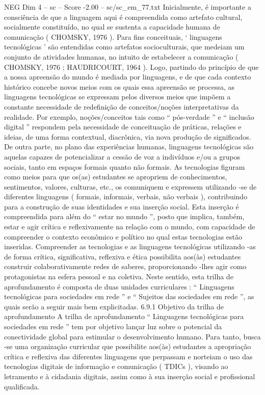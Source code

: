 \begin{textsample}{NEG Dim 4 – sc – Score -2.00 – sc/sc\_em\_77.txt}
Inicialmente, é importante a consciência de que a linguagem aqui é compreendida como artefato cultural, socialmente constituído, no qual se sustenta a capacidade humana de comunicação ( CHOMSKY, 1976 ).
Para fins conceituais, ‘ linguagens tecnológicas ’ são entendidas como artefatos socioculturais, que medeiam um conjunto de atividades humanas, no intuito de estabelecer a comunicação ( CHOMSKY, 1976 ; HAUDRICOURT, 1964 ).
Logo, partindo do princípio de que a nossa apreensão do mundo é mediada por linguagens, e de que cada contexto histórico concebe novos meios com os quais essa apreensão se processa, as linguagens tecnológicas se expressam pelos diversos meios que impõem a constante necessidade de redefinição de conceitos/noções interpretativas da realidade.
Por exemplo, noções/conceitos tais como “ pós-verdade ” e “ inclusão digital ” respondem pela necessidade de conceituação de práticas, relações e ideias, de uma forma contextual, diacrônica, via nova produção de significados.
De outra parte, no plano das experiências humanas, linguagens tecnológicas são aquelas capazes de potencializar a cessão de voz a indivíduos e/ou a grupos sociais, tanto em espaços formais quanto não formais.
As tecnologias figuram como meios para que os(as) estudantes se apropriem de conhecimentos, sentimentos, valores, culturas, etc., os comuniquem e expressem utilizando -se de diferentes linguagens ( formais, informais, verbais, não verbais ), contribuindo para a construção de suas identidades e sua inserção social.
Esta inserção é compreendida para além do “ estar no mundo ”, posto que implica, também, estar e agir crítica e reflexivamente na relação com o mundo, com capacidade de compreender o contexto econômico e político no qual estas tecnologias estão inseridas.
Compreender as tecnologias e as linguagens tecnológicas utilizando -as de forma crítica, significativa, reflexiva e ética possibilita aos(às) estudantes construir colaborativamente redes de saberes, proporcionando -lhes agir como protagonistas na esfera pessoal e na coletiva.
Neste sentido, esta trilha de aprofundamento é composta de duas unidades curriculares : “ Linguagens tecnológicas para sociedades em rede ” e “ Sujeitos das sociedades em rede ”, as quais serão a seguir mais bem explicitadas. 6.9.1 Objetivo da trilha de aprofundamento A trilha de aprofundamento “ Linguagens tecnológicas para sociedades em rede ” tem por objetivo lançar luz sobre o potencial da conectividade global para estimular o desenvolvimento humano.
Para tanto, busca -se uma organização curricular que possibilite aos(às) estudantes a apropriação crítica e reflexiva das diferentes linguagens que perpassam e norteiam o uso das tecnologias digitais de informação e comunicação ( TDICs ), visando ao letramento e à cidadania digitais, assim como à sua inserção social e profissional qualificada.

\end{textsample}
